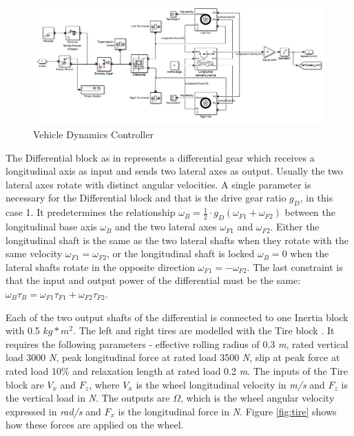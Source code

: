\begin{figure}[h]
\centering
\includegraphics[scale=0.5]{figures/hev/vehiclecontroller}
\caption{Vehicle Dynamics Controller}
\label{fig:vehiclecontroller}
\end{figure}

The Differential block as in \citet{differentialMatlab} represents a differential gear which receives a longitudinal axis as input and sends two lateral axes as output. Usually the two lateral axes rotate with distinct angular velocities. A single parameter is necessary for the Differential block and that is the  drive gear ratio $g_D$, in this case 1. It predetermines the relationship $\omega_B = \frac{1}{2} \cdot g_D(\omega_{F1} + \omega_{F2})$ between the longitudinal base axis $\omega_B$ and the two lateral axes $\omega_{F1}$ and $\omega_{F2}$. Either the longitudinal shaft is the same as the two lateral shafts when they rotate with the same velocity $\omega_{F1} = \omega_{F2}$, or the longitudinal shaft is locked $\omega_B = 0$ when the lateral shafts rotate in the opposite direction $\omega_{F1} = -\omega_{F2}$. The last constraint is that the input and output power of the differential must be the same: $\omega_B \tau_B = \omega_{F1} \tau_{F1} + \omega_{F2} \tau_{F2}$.

Each of the two output shafts of the differential is connected to one Inertia block with 0.5 $kg*m^2$. The left and right tires are modelled with the Tire block \citep{tireMatlab}. It requires the following parameters - effective rolling radius of 0.3 \textit{m}, rated vertical load 3000 \textit{N}, peak longitudinal force at rated load 3500 \textit{N}, slip at peak force at rated load 10\% and relaxation length at rated load 0.2 \textit{m}. The inputs of the Tire block are $V_x$ and $F_z$, where $V_x$ is the wheel longitudinal velocity in \textit{m/s} and $F_z$ is the vertical load in \textit{N}. The outputs are $\Omega$, which is the wheel angular velocity expressed in \textit{rad/s} and $F_x$ is the longitudinal force in \textit{N}. Figure \ref{fig:tire} shows how these forces are applied on the wheel.

